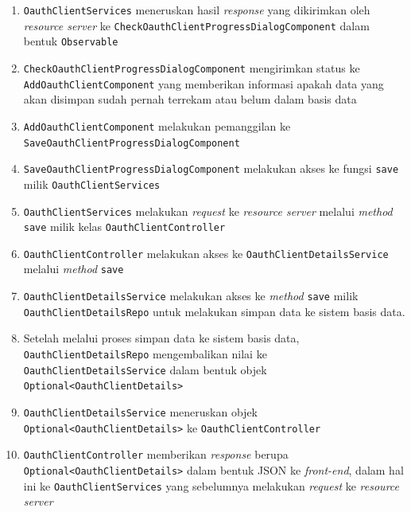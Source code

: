 \documentclass[pdftex,12pt, oneside]{article}
\begin{document}
\begin{itemize}
\begin{enumerate}
		\item \texttt{OauthClientServices} meneruskan hasil \textit{response} yang dikirimkan oleh \textit{resource server} ke \texttt{CheckOauthClientProgressDialogComponent} dalam bentuk \texttt{Observable}
		
		\item \texttt{CheckOauthClientProgressDialogComponent} mengirimkan status ke \texttt{AddOauthClientComponent} yang memberikan informasi apakah data yang akan disimpan sudah pernah terrekam atau belum dalam basis data
		
		\item \texttt{AddOauthClientComponent} melakukan pemanggilan ke \texttt{SaveOauthClientProgressDialogComponent}
		
		\item \texttt{SaveOauthClientProgressDialogComponent} melakukan akses ke fungsi \texttt{save} milik \texttt{OauthClientServices}
		
		\item \texttt{OauthClientServices} melakukan \textit{request} ke \textit{resource server} melalui \textit{method} \texttt{save} milik kelas \texttt{OauthClientController}
		
		\item \texttt{OauthClientController} melakukan akses ke \texttt{OauthClientDetailsService} melalui \textit{method} \texttt{save}
		
		\item \texttt{OauthClientDetailsService} melakukan akses ke \textit{method} \texttt{save} milik \texttt{OauthClientDetailsRepo} untuk melakukan simpan data ke sistem basis data.
		
		\item Setelah melalui proses simpan data ke sistem basis data, \texttt{OauthClientDetailsRepo} mengembalikan nilai ke \texttt{OauthClientDetailsService} dalam bentuk objek \texttt{Optional<OauthClientDetails>}
		
		\item \texttt{OauthClientDetailsService} meneruskan objek \texttt{Optional<OauthClientDetails>} ke \texttt{OauthClientController}
		
		\item \texttt{OauthClientController} memberikan \textit{response} berupa \texttt{Optional<OauthClientDetails>} dalam bentuk JSON ke \textit{front-end}, dalam hal ini ke \texttt{OauthClientServices} yang sebelumnya melakukan \textit{request} ke \textit{resource server}
		

\end{enumerate}
\end{itemize}
\end{document}
